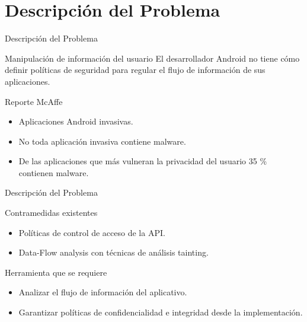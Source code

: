  \section{Descripción del Problema}
	
\begin{frame}{Descripción del Problema}
	\begin{block}{Manipulación de información del usuario}
	El desarrollador Android no tiene cómo definir políticas de seguridad para
	regular el flujo de información de sus aplicaciones.
	\end{block}
	\pause
	\begin{block}{ Reporte McAffe}
		\begin{itemize}
	  	\item Aplicaciones Android invasivas.
	  	\item No toda aplicación invasiva contiene malware.
	  	\item De las aplicaciones que más vulneran la privacidad del usuario 35 \%
	  	contienen malware.
		\end{itemize}
	\end{block}
\end{frame}

\begin{frame}{Descripción del Problema}
	\begin{block}{Contramedidas existentes}
		\begin{itemize}
		  \item Políticas de control de acceso de la API.
		  \item Data-Flow analysis con técnicas de análisis tainting.
		\end{itemize}
	\end{block}
	\pause
	\begin{block}{Herramienta que se requiere}
		\begin{itemize}
		  \item Analizar el flujo de información del aplicativo.
		  \item Garantizar políticas de confidencialidad e integridad desde la
		  implementación.
		\end{itemize}
	\end{block}
\end{frame}